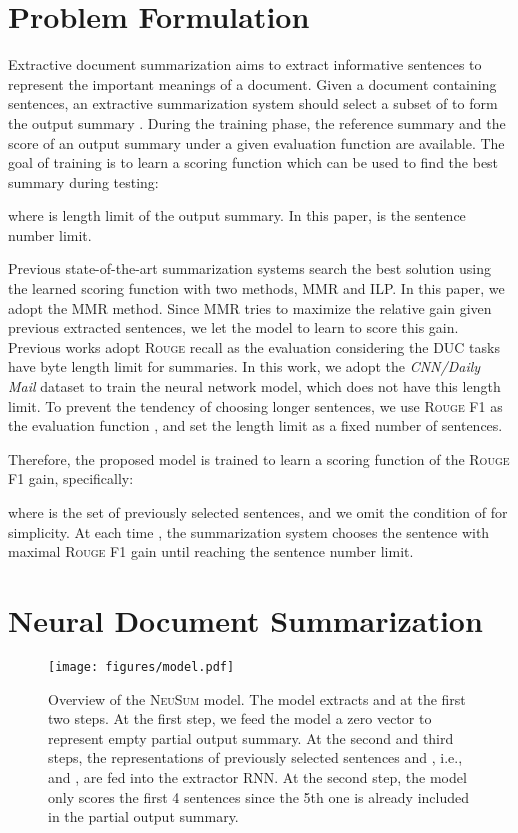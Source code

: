 \documentclass[11pt,a4paper]{article}
\newcommand{\ourModelName}{\textsc{NeuSum}}
\newcommand{\cnndm}{\textit{CNN/Daily Mail}}
\begin{document}
 \section{Problem Formulation}
\label{sec:problem}

Extractive document summarization aims to extract informative sentences to represent the important meanings of a document.
Given a document   containing  sentences, an extractive summarization system should select a subset of  to form the output summary .
During the training phase, the reference summary  and the  score of an output summary  under a given evaluation function  are available.
The goal of training is to learn a scoring function  which can be used to find the best summary during testing:


where  is length limit of the output summary.
In this paper,  is the sentence number limit.

Previous state-of-the-art summarization systems search the best solution using the learned scoring function  with two methods, MMR and ILP.
In this paper, we adopt the MMR method.
Since MMR tries to maximize the relative gain given previous extracted sentences, we let the model to learn to score this gain.
Previous works adopt \textsc{Rouge} recall as the evaluation  considering the DUC tasks have byte length limit for summaries.
In this work, we adopt the \cnndm{} dataset to train the neural network model, which does not have this length limit.
To prevent the tendency of choosing longer sentences, we use \textsc{Rouge} F1 as the evaluation function , and set the length limit  as a fixed number of sentences.

Therefore, the proposed model is trained to learn a scoring function  of the \textsc{Rouge} F1 gain, specifically:

where  is the set of previously selected sentences, and we omit the condition  of  for simplicity.
At each time , the summarization system chooses the sentence with maximal \textsc{Rouge} F1 gain until reaching the sentence number limit.



  \section{Neural Document Summarization}

\begin{figure*}[htbp]
	\centering
	\texttt{[image: figures/model.pdf]}
	\caption{\label{fig:model} Overview of the \ourModelName{} model. The model extracts   and  at the first two steps.
		At the first step, we feed the model a zero vector  to represent empty partial output summary. At the second and third steps, the representations of previously selected sentences  and , i.e.,  and , are fed into the extractor RNN. At the second step, the model only scores the first 4 sentences since the 5th one is already included in the partial output summary.}
\end{figure*}
\end{document}
